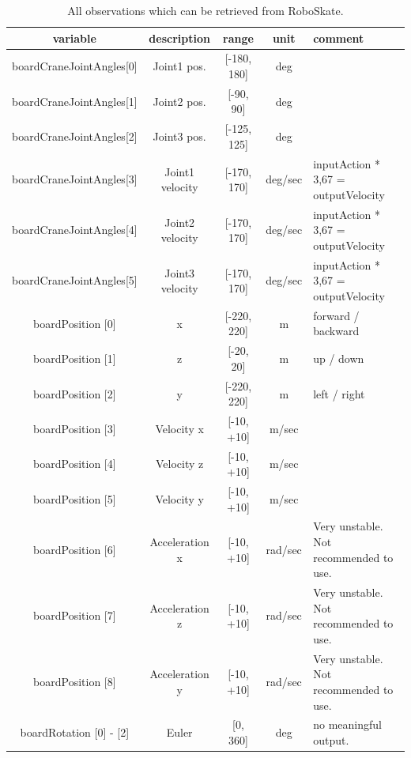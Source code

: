 \documentclass[conference]{IEEEtran}
\begin{document}
\begin{table}[ht!]
    \renewcommand{\arraystretch}{1.3}
    \caption{All observations which can be retrieved from RoboSkate.}
    \label{tab:all_observation}
    \centering
    \begin{tabular}{c|c|c|c|p{6cm}}
        \textbf{variable}  & \textbf{description}  & \textbf{range}  & \textbf{unit}  & \textbf{comment} \\
        \hline
        \hline
        boardCraneJointAngles[0] & Joint1 pos. & [-180, 180] & deg  &   \\
        boardCraneJointAngles[1] & Joint2 pos. &  [-90, 90]  &  deg &    \\
        boardCraneJointAngles[2] & Joint3 pos. &  [-125, 125]  &  deg &    \\
        boardCraneJointAngles[3] & Joint1 velocity &  [-170, 170]  &  deg/sec  & inputAction * 3,67 = outputVelocity \\
        boardCraneJointAngles[4] & Joint2 velocity &  [-170, 170]  &  deg/sec  & inputAction * 3,67 = outputVelocity \\ 
        boardCraneJointAngles[5] & Joint3 velocity &  [-170, 170]  &  deg/sec  & inputAction * 3,67 = outputVelocity \\
        \hline
        boardPosition [0] &  x  &  [-220, 220]  &  m  &  forward / backward\\
        boardPosition [1] &  z  &  [-20, 20]  &  m  &  up / down \\
        boardPosition [2] &  y  &  [-220, 220]  &  m  &  left / right \\
        boardPosition [3] &  Velocity x  &  [-10, +10]  &  m/sec  &  \\
        boardPosition [4] &  Velocity z  &  [-10, +10]  &  m/sec  & \\
        boardPosition [5] &  Velocity y  &  [-10, +10]   &  m/sec  & \\
        boardPosition [6] &  Acceleration x  &  [-10, +10]  &  rad/sec  & Very unstable. Not recommended to use. \\
        boardPosition [7] &  Acceleration z  &  [-10, +10]  &  rad/sec  & Very unstable. Not recommended to use. \\
        boardPosition [8] &  Acceleration y  &  [-10, +10]  &  rad/sec  & Very unstable. Not recommended to use.\\
        \hline
        boardRotation [0] - [2] &  Euler  &  [0, 360]  &  deg  &  no meaningful output.  \\

\end{tabular}
\end{table}
\end{document}
